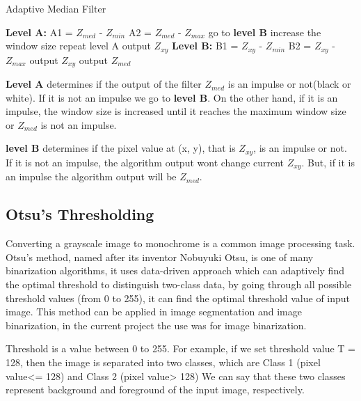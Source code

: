 \begin{algorithm}[t]
	\caption{Adaptive Median Filter}
	\label{Algo2}
	\begin{spacing}{1.5}
		\begin{algorithmic}[1]
			\State \textbf{Level A:}
			\State A1 = $Z_{med}$ - $Z_{min}$
			\State A2 = $Z_{med}$ - $Z_{max}$
			\State go to \textbf{level B}
			\Else
			\State increase the window size
			\State repeat level A
			\Else 
			\State output $Z_{xy}$
			\EndIf
			\EndIf
			\State \textbf{Level B:}
			\State B1 =  $Z_{xy}$ -  $Z_{min}$
			\State B2 =  $Z_{xy}$ -  $Z_{max}$
			\State output $Z_{xy}$
			\Else
			\State output $Z_{med}$
			\EndIf
		\end{algorithmic}
	\end{spacing}
\end{algorithm}

\vspace{4cm}

\textbf{Level A} determines if the output of the filter $Z_{med}$ is an impulse or not(black or white). If it is not an impulse we go to \textbf{level B}. On the other hand, if it is an impulse, the window size is increased until it reaches the maximum window size or $Z_{med}$ is not an impulse. 

\textbf{level B} determines if the pixel value at (x, y), that is $Z_{xy}$, is an impulse or not. If it is not an impulse, the algorithm output wont change current $Z_{xy}$. But, if it is an impulse the algorithm output will be  $Z_{med}$. 

\subsection{Otsu’s Thresholding}

Converting a grayscale image to monochrome is a common image
processing task. Otsu's method, named after its inventor Nobuyuki Otsu, is one of many binarization algorithms, it uses data-driven approach which can adaptively find the optimal threshold to distinguish two-class data, by going through all possible threshold values (from 0 to 255), it can find the optimal threshold value of input image. This method can be applied in image segmentation and image binarization, in the current project the use was for image binarization.

Threshold is a value between 0 to 255. For example, if we set threshold value T = 128, then the image is separated into two classes, which are Class 1 (pixel value<= 128) and Class 2 (pixel value> 128) We can say that these two classes represent background and foreground of the input image, respectively.

